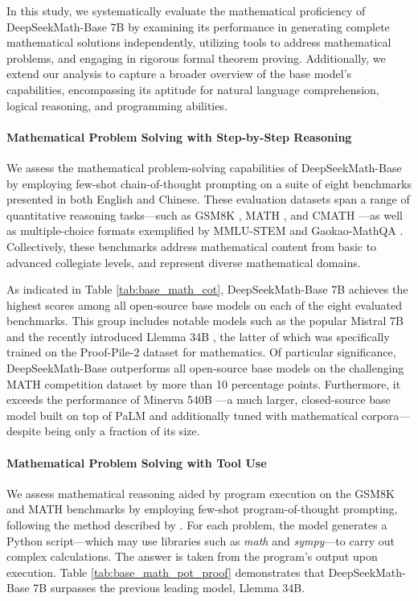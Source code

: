 \begin{itemize}[topsep=0pt]
In this study, we systematically evaluate the mathematical proficiency of DeepSeekMath-Base 7B by examining its performance in generating complete mathematical solutions independently, utilizing tools to address mathematical problems, and engaging in rigorous formal theorem proving. Additionally, we extend our analysis to capture a broader overview of the base model's capabilities, encompassing its aptitude for natural language comprehension, logical reasoning, and programming abilities.

\paragraph{Mathematical Problem Solving with Step-by-Step Reasoning}

We assess the mathematical problem-solving capabilities of DeepSeekMath-Base by employing few-shot chain-of-thought prompting \citep{cot} on a suite of eight benchmarks presented in both English and Chinese. These evaluation datasets span a range of quantitative reasoning tasks—such as GSM8K \citep{gsm8k}, MATH \citep{MATH}, and CMATH \citep{wei2023cmath}—as well as multiple-choice formats exemplified by MMLU-STEM \citep{mmlu} and Gaokao-MathQA \citep{agieval}. Collectively, these benchmarks address mathematical content from basic to advanced collegiate levels, and represent diverse mathematical domains.

As indicated in Table \ref{tab:base_math_cot}, DeepSeekMath-Base 7B achieves the highest scores among all open-source base models on each of the eight evaluated benchmarks. This group includes notable models such as the popular Mistral 7B \citep{mistral} and the recently introduced Llemma 34B \citep{llemma}, the latter of which was specifically trained on the Proof-Pile-2 dataset \citep{llemma} for mathematics. Of particular significance, DeepSeekMath-Base outperforms all open-source base models on the challenging MATH competition dataset by more than 10 percentage points. Furthermore, it exceeds the performance of Minerva 540B \citep{minerva}—a much larger, closed-source base model built on top of PaLM \citep{palm} and additionally tuned with mathematical corpora—despite being only a fraction of its size.

\paragraph{Mathematical Problem Solving with Tool Use} We assess mathematical reasoning aided by program execution on the GSM8K and MATH benchmarks by employing few-shot program-of-thought prompting, following the method described by \citet{pot,pal}. For each problem, the model generates a Python script—which may use libraries such as \textit{math} and \textit{sympy}—to carry out complex calculations. The answer is taken from the program's output upon execution. Table \ref{tab:base_math_pot_proof} demonstrates that DeepSeekMath-Base 7B surpasses the previous leading model, Llemma 34B.


\end{itemize}
